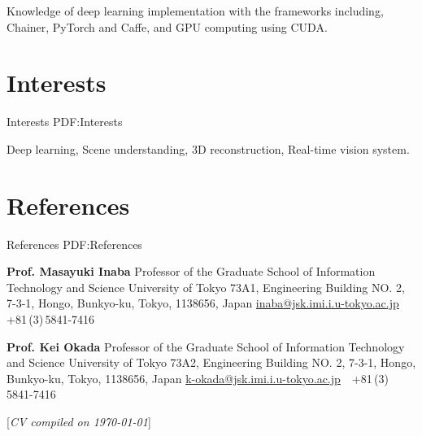 \documentclass[letterpaper,MMMyyyy,nonstop]{simpleresumecv}
\newcommand{\CVNote}{CV compiled on {\today}}
\begin{document}
\begin{body}
\BulletItem
Knowledge of deep learning implementation with the frameworks including, Chainer, PyTorch and Caffe,
and GPU computing using CUDA.

%
%


\section
{Interests}
{Interests}
{PDF:Interests}

Deep learning,
Scene understanding,
3D reconstruction,
Real-time vision system.


\section
{References}
{References}
{PDF:References}

\textbf{Prof. Masayuki Inaba}
\newline
Professor of the Graduate School of Information Technology and Science
\newline
University of Tokyo
\newline
73A1, Engineering Building NO. 2, 7-3-1, Hongo, Bunkyo-ku, Tokyo, 1138656, Japan
\newline
\href{mailto:inaba@jsk.imi.i.u-tokyo.ac.jp}
{inaba@jsk.imi.i.u-tokyo.ac.jp}
\,\SubBulletSymbol\,
+81\,(3)\,5841-7416

\BigGapNoBreak

\textbf{Prof. Kei Okada}
\newline
Professor of the Graduate School of Information Technology and Science
\newline
University of Tokyo
\newline
73A2, Engineering Building NO. 2, 7-3-1, Hongo, Bunkyo-ku, Tokyo, 1138656, Japan
\newline
\href{mailto:k-okada@jsk.imi.i.u-tokyo.ac.jp}
{k-okada@jsk.imi.i.u-tokyo.ac.jp}
\,\SubBulletSymbol\,
+81\,(3)\,5841-7416

\end{body}


\UseNoteFont%
\null\hfill%
[\textit{\CVNote}]%
\hspace{2.0mm}\null
\end{document}
